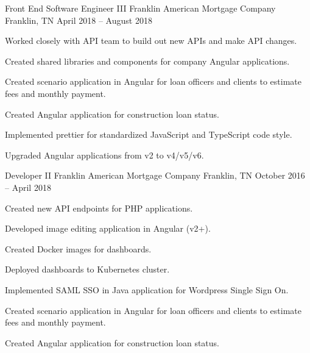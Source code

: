 \documentclass[letterpaper]{awesome-cv}
\begin{document}
\begin{cventries}

  \cventry
    {Front End Software Engineer III}
    {Franklin American Mortgage Company}
    {Franklin, TN}
    {April 2018 – August 2018}
    {\begin{cvitems}
      \item {Worked closely with API team to build out new APIs and make API changes.}
      \item {Created shared libraries and components for company Angular applications.}
      \item {Created scenario application in Angular for loan officers and clients to estimate fees and monthly payment.}
      \item {Created Angular application for construction loan status.}
      \item {Implemented prettier for standardized JavaScript and TypeScript code style.}
      \item {Upgraded Angular applications from v2 to v4/v5/v6.}
      \end{cvitems}}

  \cventry
    {Developer II}
    {Franklin American Mortgage Company}
    {Franklin, TN}
    {October 2016 – April 2018}
    {\begin{cvitems}
      \item {Created new API endpoints for PHP applications.}
      \item {Developed image editing application in Angular (v2+).}
      \item {Created Docker images for dashboards.}
      \item {Deployed dashboards to Kubernetes cluster.}
      \item {Implemented SAML SSO in Java application for Wordpress Single Sign On.}
      \item {Created scenario application in Angular for loan officers and clients to estimate fees and monthly payment.}
      \item {Created Angular application for construction loan status.}
      \end{cvitems}}


\end{cventries}
\end{document}
